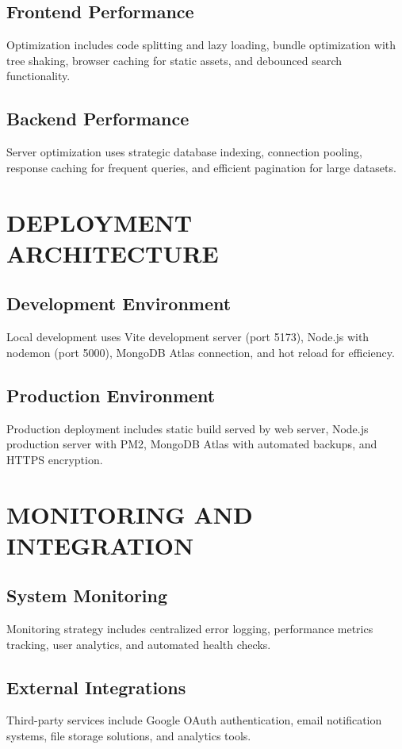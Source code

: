\subsection{Frontend Performance}
Optimization includes code splitting and lazy loading, bundle optimization with tree shaking, browser caching for static assets, and debounced search functionality.

\subsection{Backend Performance}
Server optimization uses strategic database indexing, connection pooling, response caching for frequent queries, and efficient pagination for large datasets.

\section{DEPLOYMENT ARCHITECTURE}

\subsection{Development Environment}
Local development uses Vite development server (port 5173), Node.js with nodemon (port 5000), MongoDB Atlas connection, and hot reload for efficiency.

\subsection{Production Environment}
Production deployment includes static build served by web server, Node.js production server with PM2, MongoDB Atlas with automated backups, and HTTPS encryption.

\section{MONITORING AND INTEGRATION}

\subsection{System Monitoring}
Monitoring strategy includes centralized error logging, performance metrics tracking, user analytics, and automated health checks.

\subsection{External Integrations}
Third-party services include Google OAuth authentication, email notification systems, file storage solutions, and analytics tools.

